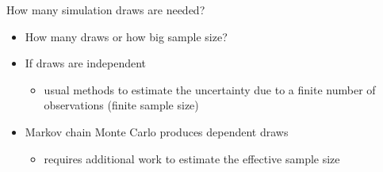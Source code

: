 \documentclass[finnish,english,t]{beamer}
\renewcommand{\emph}[1]{\textcolor{navyblue}{#1}}
\begin{document}
\begin{frame}
{How many simulation draws are needed?}

  \begin{itemize}
  \item How many draws or how big sample size?
  \item If draws are independent
    \begin{itemize}
    \item usual methods to estimate the uncertainty due to a finite
      number of observations (finite sample size)
    \end{itemize}
  \item Markov chain Monte Carlo produces dependent draws
    \begin{itemize}
    \item requires additional work to estimate the \emph{effective
        sample size}
    \end{itemize}
  \end{itemize}

\end{frame}
\end{document}
